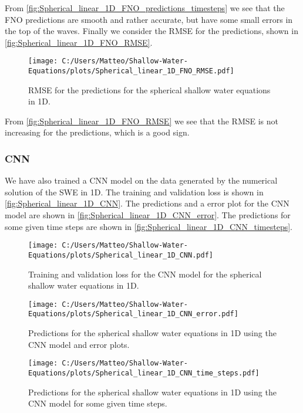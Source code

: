 From \autoref{fig:Spherical_linear_1D_FNO_predictions_timesteps} we see that the FNO predictions are smooth and rather accurate, but have some small errors in the top of the waves.
Finally we consider the RMSE for the predictions, shown in \autoref{fig:Spherical_linear_1D_FNO_RMSE}.
\begin{figure}[H]
    \centering
    \texttt{[image: C:/Users/Matteo/Shallow-Water-Equations/plots/Spherical\_linear\_1D\_FNO\_RMSE.pdf]}
    \caption{RMSE for the predictions for the spherical shallow water equations in 1D.}\label{fig:Spherical_linear_1D_FNO_RMSE}
\end{figure}
From \autoref{fig:Spherical_linear_1D_FNO_RMSE} we see that the RMSE is not increasing for the predictions, which is a good sign.

\subsubsection{CNN}
We have also trained a CNN model on the data generated by the numerical solution of the SWE in 1D.
The training and validation loss is shown in \autoref{fig:Spherical_linear_1D_CNN}.
The predictions and a error plot for the CNN model are shown in \autoref{fig:Spherical_linear_1D_CNN_error}.
The predictions for some given time steps are shown in \autoref{fig:Spherical_linear_1D_CNN_timesteps}.
\begin{figure}[H]
    \centering
    \texttt{[image: C:/Users/Matteo/Shallow-Water-Equations/plots/Spherical\_linear\_1D\_CNN.pdf]}
    \caption{Training and validation loss for the CNN model for the spherical shallow water equations in 1D.}\label{fig:Spherical_linear_1D_CNN}
\end{figure}

\begin{figure}[H]
    \centering
    \texttt{[image: C:/Users/Matteo/Shallow-Water-Equations/plots/Spherical\_linear\_1D\_CNN\_error.pdf]}
    \caption{Predictions for the spherical shallow water equations in 1D using the CNN model and error plots.}\label{fig:Spherical_linear_1D_CNN_error}
\end{figure}

\begin{figure}[H]
    \centering
    \texttt{[image: C:/Users/Matteo/Shallow-Water-Equations/plots/Spherical\_linear\_1D\_CNN\_time\_steps.pdf]}
    \caption{Predictions for the spherical shallow water equations in 1D using the CNN model for some given time steps.}\label{fig:Spherical_linear_1D_CNN_timesteps}
\end{figure}

